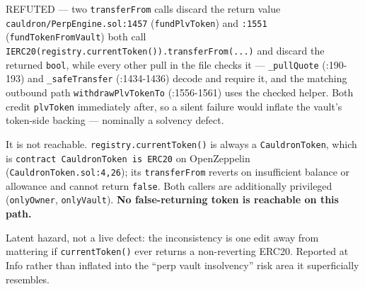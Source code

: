 \documentclass[11pt,a4paper]{article}
\newcommand{\code}[1]{\texttt{\small #1}}
\newcommand{\fileref}[1]{\texttt{\scriptsize #1}}
\begin{document}
\begin{notebox}{REFUTED --- two \code{transferFrom} calls discard the return value}
\fileref{cauldron/PerpEngine.sol:1457} (\code{fundPlvToken}) and \fileref{:1551}
(\code{fundTokenFromVault}) both call
\code{IERC20(registry.currentToken()).transferFrom(...)} and discard the returned
\code{bool}, while every other pull in the file checks it --- \code{\_pullQuote}
(:190-193) and \code{\_safeTransfer} (:1434-1436) decode and require it, and the matching
outbound path \code{withdrawPlvTokenTo} (:1556-1561) uses the checked helper. Both credit
\code{plvToken} immediately after, so a silent failure would inflate the vault's
token-side backing --- nominally a solvency defect.

It is not reachable. \code{registry.currentToken()} is always a \code{CauldronToken},
which is \code{contract CauldronToken is ERC20} on OpenZeppelin
(\fileref{CauldronToken.sol:4,26}); its \code{transferFrom} reverts on insufficient
balance or allowance and cannot return \code{false}. Both callers are additionally
privileged (\code{onlyOwner}, \code{onlyVault}). \textbf{No false-returning token is
reachable on this path.}

Latent hazard, not a live defect: the inconsistency is one edit away from mattering if
\code{currentToken()} ever returns a non-reverting ERC20. Reported at Info rather than
inflated into the ``perp vault insolvency'' risk area it superficially resembles.
\end{notebox}
\end{document}

